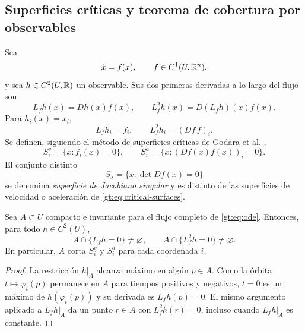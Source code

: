 \subsection{Superficies críticas y teorema de cobertura por observables}
\label{subsec:gt-superficies}

Sea
\begin{equation}
 \dot x=f(x),\qquad f\in C^1(U,\mathbb{R}^n),
 \label{gt:eq:ode}
\end{equation}
y sea $h\in C^2(U,\mathbb{R})$ un observable. Sus dos primeras derivadas a lo largo
del flujo son
\begin{equation}
 L_fh(x)=Dh(x)f(x),
 \qquad
 L_f^2h(x)=D(L_fh)(x)f(x).
 \label{gt:eq:lie-observable}
\end{equation}
Para $h_i(x)=x_i$,
\begin{equation}
 L_fh_i=f_i,\qquad L_f^2h_i=(Df\,f)_i.
 \label{gt:eq:velocity-acceleration}
\end{equation}
Se definen, siguiendo el método de superficies críticas de Godara et al.
\cite{GodaraEtAl2018CriticalSurfaces},
\begin{equation}
 S_i^v=\{x:f_i(x)=0\},
 \qquad
 S_i^a=\{x:(Df(x)f(x))_i=0\}.
 \label{gt:eq:critical-surfaces}
\end{equation}
El conjunto distinto
\begin{equation}
 S_J=\{x:\det Df(x)=0\}
 \label{gt:eq:singular-jacobian-surface}
\end{equation}
se denomina \emph{superficie de Jacobiano singular} y es distinto de las
superficies de velocidad o aceleración de \eqref{gt:eq:critical-surfaces}.

\begin{proposition}
\label{prop:gt-critical-coverage}
Sea $A\subset U$ compacto e invariante para el flujo completo de
\eqref{gt:eq:ode}. Entonces, para todo $h\in C^2(U)$,
\[
 A\cap\{L_fh=0\}\ne\varnothing,
 \qquad
 A\cap\{L_f^2h=0\}\ne\varnothing.
\]
En particular, $A$ corta $S_i^v$ y $S_i^a$ para cada coordenada $i$.
\end{proposition}

\begin{proof}
La restricción $h|_A$ alcanza máximo en algún $p\in A$. Como la órbita
$t\mapsto\varphi_t(p)$ permanece en $A$ para tiempos positivos y negativos,
$t=0$ es un máximo de $h(\varphi_t(p))$ y su derivada es
$L_fh(p)=0$. El mismo argumento aplicado a $L_fh|_A$ da un punto
$r\in A$ con $L_f^2h(r)=0$, incluso cuando $L_fh|_A$ es constante.
\end{proof}

